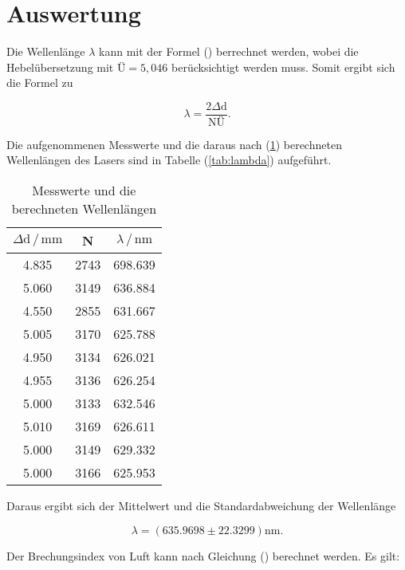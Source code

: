 \newpage
\section{Auswertung}
Die Wellenlänge $\lambda$ kann mit der Formel () berrechnet werden, 
wobei die Hebelübersetzung mit $\text{Ü}=5,046$ berücksichtigt werden muss.
Somit ergibt sich die Formel zu

\begin{equation}
\lambda=\frac{2 \Delta \text{d}}{ \text{NÜ}} .
\label{eqn:lam}
\end{equation}

\noindent
Die aufgenommenen Messwerte und die daraus nach (\ref{tab:lam}) berechneten Wellenlängen des Lasers sind in Tabelle (\ref{tab:lambda}) aufgeführt.

\begin{table}
    \centering
    \caption{Messwerte und die berechneten Wellenlängen}
    \label{tab:lam}
    \begin{tabular}{c c c}
    \toprule
    $ \Delta \text{d} \,/\, \si{\milli\meter} $ & N & $\lambda \,/\, \si{\nano\meter}$\\
    \midrule 
   
    4.835  & 2743 &  698.639 \\
    5.060  & 3149 &  636.884 \\
    4.550  & 2855 &  631.667 \\
    5.005  & 3170 &  625.788 \\
    4.950  & 3134 &  626.021 \\
    4.955  & 3136 &  626.254 \\
    5.000  & 3133 &  632.546 \\
    5.010  & 3169 &  626.611 \\
    5.000  & 3149 &  629.332 \\
    5.000  & 3166 &  625.953 \\

    \bottomrule
    \end{tabular}
  \end{table}

\noindent
Daraus ergibt sich der Mittelwert und die Standardabweichung der Wellenlänge

\begin{equation*}
\lambda = (635.9698 \pm 22.3299) \si{\nano\meter}.
\end{equation*}

\noindent
Der Brechungsindex von Luft kann nach Gleichung () berechnet werden.
Es gilt:

